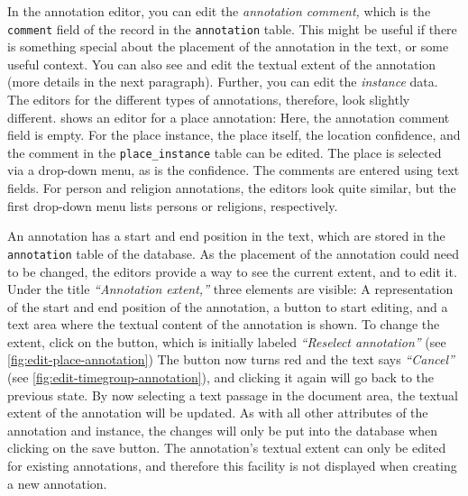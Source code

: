 In the annotation editor, you can edit the \emph{annotation comment,} which is the \verb!comment! field of the record in the \verb!annotation! table.
This might be useful if there is something special about the placement of the annotation in the text, or some useful context.
You can also see and edit the textual extent of the annotation (more details in the next paragraph).
Further, you can edit the \emph{instance} data.
The editors for the different types of annotations, therefore, look slightly different.
 shows an editor for a place annotation:
Here, the annotation comment field is empty.
For the place instance, the place itself, the location confidence, and the comment in the \verb!place_instance! table can be edited.
The place is selected via a drop-down menu, as is the confidence.
The comments are entered using text fields.
For person and religion annotations, the editors look quite similar, but the first drop-down menu lists persons or religions, respectively.

An annotation has a start and end position in the text, which are stored in the \verb!annotation! table of the database.
As the placement of the annotation could need to be changed, the editors provide a way to see the current extent, and to edit it.
Under the title \emph{\enquote{Annotation extent,}} three elements are visible:
A representation of the start and end position of the annotation, a button to start editing, and a text area where the textual content of the annotation is shown.
To change the extent, click on the button, which is initially labeled \emph{\enquote{Reselect annotation}} (see \cref{fig:edit-place-annotation})
The button now turns red and the text says \emph{\enquote{Cancel}} (see \cref{fig:edit-timegroup-annotation}), and clicking it again will go back to the previous state.
By now selecting a text passage in the document area, the textual extent of the annotation will be updated.
As with all other attributes of the annotation and instance, the changes will only be put into the database when clicking on the save button.
The annotation's textual extent can only be edited for existing annotations, and therefore this facility is not displayed when creating a new annotation.


